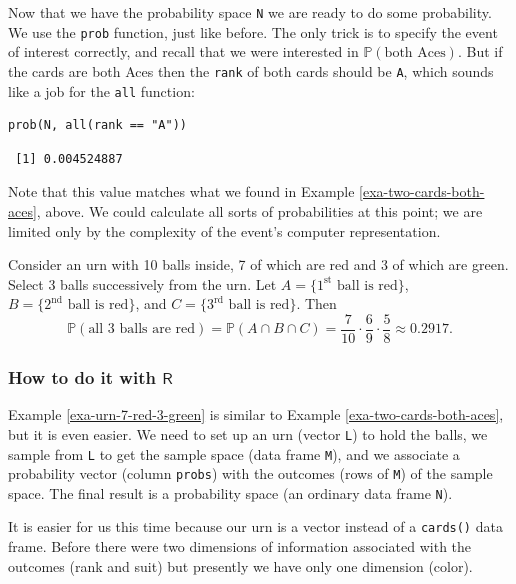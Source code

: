 \documentclass[captions=tableheading]{scrbook}
\begin{document}
Now that we have the probability space \texttt{N} we are ready to do some probability. We use the \texttt{prob} function, just like before. The only trick is to specify the event of interest correctly, and recall that we were interested in \(\mathbb{P}(\mbox{both Aces})\). But if the cards are both Aces then the \texttt{rank} of both cards should be \texttt{A}, which sounds like a job for the \texttt{all} function:


\lstset{language=R}
\begin{lstlisting}
prob(N, all(rank == "A"))
\end{lstlisting}

\begin{verbatim}
 [1] 0.004524887
\end{verbatim}

Note that this value matches what we found in Example \ref{exa-two-cards-both-aces}, above. We could calculate all sorts of probabilities at this point; we are limited only by the complexity of the event's computer representation. 


\begin{example}
Consider an urn with 10 balls inside, 7 of which are red and 3 of which are green. Select 3 balls successively from the urn. Let \( A = \{ 1^{\mathrm{st}} \mbox{ ball is red} \} \), \( B = \{ 2^{\mathrm{nd}} \mbox{ ball is red} \} \), and \( C = \{ 3^{\mathrm{rd}} \mbox{ ball is red} \} \). Then
\[
\mathbb{P}(\mbox{all 3 balls are red})=\mathbb{P}(A\cap B\cap C)=\frac{7}{10}\cdot\frac{6}{9}\cdot\frac{5}{8}\approx 0.2917.
\]

\end{example}
\subsubsection{How to do it with \(\mathsf{R}\)}
\label{sec-4-6-2-2}


Example \ref{exa-urn-7-red-3-green} is similar to Example \ref{exa-two-cards-both-aces}, but it is even easier. We need to set up an urn (vector \texttt{L}) to hold the balls, we sample from \texttt{L} to get the sample space (data frame \texttt{M}), and we associate a probability vector (column \texttt{probs}) with the outcomes (rows of \texttt{M}) of the sample space. The final result is a probability space (an ordinary data frame \texttt{N}).

It is easier for us this time because our urn is a vector instead of a \texttt{cards()} data frame. Before there were two dimensions of information associated with the outcomes (rank and suit) but presently we have only one dimension (color).
\end{document}
